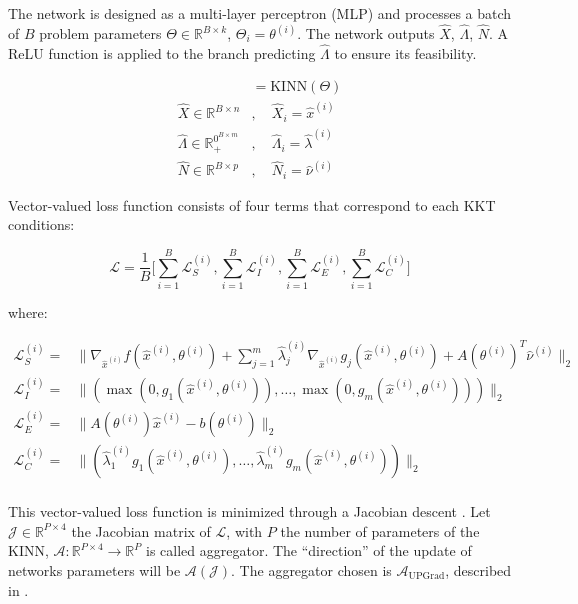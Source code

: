 \documentclass[
]{article}
\begin{document}
The network is designed as a multi-layer perceptron (MLP) and processes
a batch of \(B\) problem parameters
\(\Theta \in \mathbb{R}^{B \times k}\), \(\Theta_i = \theta^{(i)}\). The
network outputs \(\hat{X}\), \(\hat\Lambda\), \(\hat{N}\). A ReLU
function is applied to the branch predicting \(\hat\Lambda\) to ensure
its feasibility.

\begin{align}
[\hat{X}, \hat{\Lambda}, \hat{N}] &= \textrm{KINN}(\Theta)\\
\hat{X} \in \mathbb{R}^{B\times n}&, \quad \hat X_i = \hat{x}^{(i)}\\
\hat{\Lambda} \in \mathbb{R}^{0^{B\times m}}_+&, \quad \hat\Lambda_i = \hat\lambda^{(i)}\\
\hat{N} \in \mathbb{R}^{B\times p}&, \quad \hat{N}_i = \hat\nu^{(i)}
\end{align}

Vector-valued loss function consists of four terms that correspond to
each KKT conditions:

\begin{equation}
\mathcal{L} = \frac{1}{B}\biggr[\sum_{i=1}^B\mathcal{L}_{S}^{(i)}, \sum_{i=1}^B\mathcal{L}_{I}^{(i)}, \sum_{i=1}^B\mathcal{L}_{E}^{(i)}, \sum_{i=1}^B\mathcal{L}_{C}^{(i)}\biggr] 
\end{equation}

where:

\begin{align}
    \mathcal{L}_{S}^{(i)} =& \|\nabla_{\hat{x}^{(i)}} f(\hat{x}^{(i)}, \theta^{(i)}) + \sum\nolimits_{j=1}^m \hat{\lambda}^{(i)}_j\nabla_{\hat{x}^{(i)}} g_j(\hat{x}^{(i)}, \theta^{(i)}) + A(\theta^{(i)})^T\hat{\nu}^{(i)}\|_2\\ 
    \mathcal{L}_{I}^{(i)}  =& \|(\max(0, g_1(\hat{x}^{(i)}, \theta^{(i)})),\dots,\max(0, g_m(\hat{x}^{(i)}, \theta^{(i)})))\|_2\\
    \mathcal{L}_{E}^{(i)} =& \|A(\theta^{(i)}) \hat{x}^{(i)} - b(\theta^{(i)})\|_2\\
    \mathcal{L}_{C}^{(i)}  =& \|(\hat{\lambda}_1^{(i)} g_1(\hat{x}^{(i)}, \theta^{(i)}),\dots,\hat{\lambda}_m^{(i)} g_m(\hat{x}^{(i)}, \theta^{(i)}))\|_2\\
\end{align}

This vector-valued loss function is minimized through a Jacobian descent
\autocite{quintonJacobianDescentMultiObjective2024a}. Let
\(\mathcal{J} \in \mathbb{R}^{P\times4}\) the Jacobian matrix of
\(\mathcal{L}\), with \(P\) the number of parameters of the KINN,
\(\mathcal{A}: \mathbb{R}^{P\times4} \to \mathbb{R}^{P}\) is called
aggregator. The ``direction'' of the update of networks parameters will
be \(\mathcal{A}(\mathcal{J})\). The aggregator chosen is
\(\mathcal{A}_{\mathrm{UPGrad}}\), described in
\autocite{quintonJacobianDescentMultiObjective2024a}.
\end{document}
